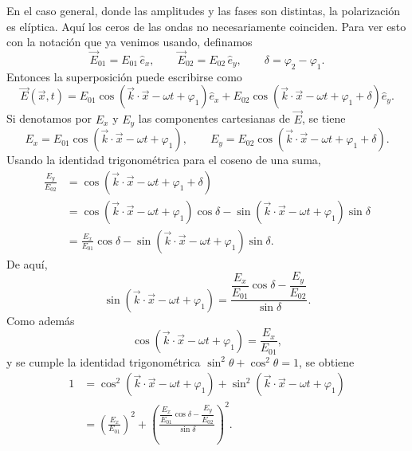 \documentclass[12pt,a4paper]{article}
\theoremstyle{definition}
\theoremstyle{plain}
\numberwithin{equation}{section}
\theoremstyle{remark}
\begin{document}
En el caso general, donde las amplitudes y las fases son distintas, la polarización es elíptica. Aquí los ceros de las ondas no necesariamente coinciden. Para ver esto con la notación que ya venimos usando, definamos
\begin{equation*}
    \vec E_{01}=E_{01}\,\hat e_x,
    \qquad
    \vec E_{02}=E_{02}\,\hat e_y,
    \qquad
    \delta=\varphi_2-\varphi_1.
\end{equation*}
Entonces la superposición puede escribirse como
\begin{equation*}
    \vec E(\vec x,t)=E_{01}\cos\left(\vec k\cdot\vec x-\omega t+\varphi_1\right)\hat e_x+E_{02}\cos\left(\vec k\cdot\vec x-\omega t+\varphi_1+\delta\right)\hat e_y.
\end{equation*}
Si denotamos por $E_x$ y $E_y$ las componentes cartesianas de $\vec E$, se tiene
\begin{equation*}
    E_x=E_{01}\cos\left(\vec k\cdot\vec x-\omega t+\varphi_1\right),
    \qquad
    E_y=E_{02}\cos\left(\vec k\cdot\vec x-\omega t+\varphi_1+\delta\right).
\end{equation*}
Usando la identidad trigonométrica para el coseno de una suma,
\begin{align*}
    \frac{E_y}{E_{02}}
    &= \cos\left(\vec k\cdot\vec x-\omega t+\varphi_1+\delta\right) \\
    &= \cos\left(\vec k\cdot\vec x-\omega t+\varphi_1\right)\cos\delta
       -\sin\left(\vec k\cdot\vec x-\omega t+\varphi_1\right)\sin\delta \\
    &= \frac{E_x}{E_{01}}\cos\delta
       -\sin\left(\vec k\cdot\vec x-\omega t+\varphi_1\right)\sin\delta.
\end{align*}
De aquí,
\begin{equation*}
    \sin\left(\vec k\cdot\vec x-\omega t+\varphi_1\right)
    =\frac{\dfrac{E_x}{E_{01}}\cos\delta-\dfrac{E_y}{E_{02}}}{\sin\delta}.
\end{equation*}
Como además
\begin{equation*}
    \cos\left(\vec k\cdot\vec x-\omega t+\varphi_1\right)=\frac{E_x}{E_{01}},
\end{equation*}
y se cumple la identidad trigonométrica $\sin^2\theta+\cos^2\theta=1$, se obtiene
\begin{align*}
    1
    &= \cos^2\left(\vec k\cdot\vec x-\omega t+\varphi_1\right)
      +\sin^2\left(\vec k\cdot\vec x-\omega t+\varphi_1\right) \\
    &= \left(\frac{E_x}{E_{01}}\right)^2+
       \left(\frac{\dfrac{E_x}{E_{01}}\cos\delta-\dfrac{E_y}{E_{02}}}{\sin\delta}\right)^2.
\end{align*}
\end{document}
